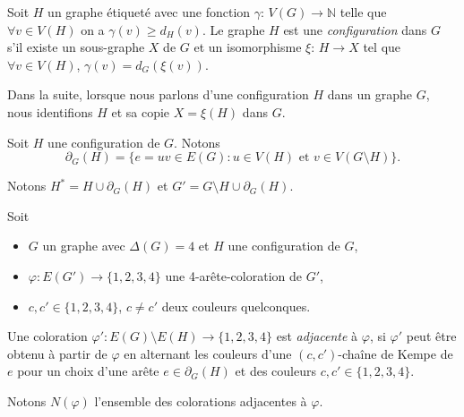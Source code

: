 \documentclass{beamer}
\begin{document}
\begin{frame}
Soit $H$ un graphe étiqueté avec une fonction $\gamma$: $V(G) \to \mathbb{N}$ telle que $\forall v \in V(H)$ on a $\gamma(v) \geq d_H(v)$. Le graphe $H$ est une \emph{configuration} dans $G$ s'il existe un sous-graphe $X$ de $G$ et un isomorphisme $\xi$: $H \to X$ tel que $\forall v \in V(H)$, $\gamma(v) = d_G(\xi(v))$. 



Dans la suite, lorsque nous parlons d'une configuration $H$ dans un graphe $G$, nous identifions $H$ et sa copie $X=\xi(H)$ dans $G$.
\end{frame}

\begin{frame}
Soit $H$ une configuration de $G$. Notons
$$
\partial_G(H) = \{e =uv \in E(G) : u \in V(H)\textrm{ et }v \in V(G \setminus H)\}.
$$ 

\pause


Notons $H^* = H \cup \partial_G(H)$ et $G'=G\setminus H \cup \partial_G(H)$.
\end{frame}


\begin{frame}
Soit 
\begin{itemize}
\item $G$ un graphe avec $\Delta(G)=4$ et $H$ une configuration de $G$,
\item $\varphi:E(G')\to \{1,2,3,4\}$ une 4-arête-coloration de $G'$,
\item $c, c' \in \{1,2,3,4\}$, $c\ne c'$ deux couleurs quelconques. 
\end{itemize}

Une coloration $\varphi':E(G)\setminus E(H)\to \{1,2,3,4\}$ est \emph{adjacente} à $\varphi$, si $\varphi'$ peut être obtenu à partir de $\varphi$ en alternant les couleurs d'une $(c,c')$-chaîne de Kempe de $e$ pour un choix d'une arête $e\in\partial_G(H)$ et des couleurs $c,c'\in\{1,2,3,4\}$. 

\pause

Notons $N(\varphi)$ l'ensemble des colorations adjacentes à $\varphi$.
\end{frame}
\end{document}
